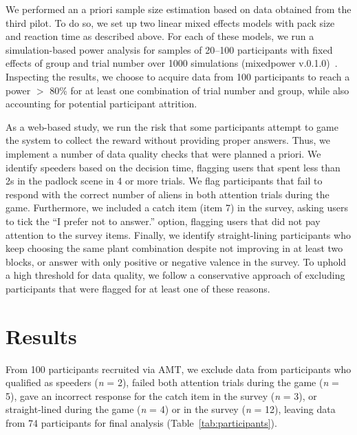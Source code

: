 We performed an a priori sample size estimation based on data obtained from the third pilot. 
To do so, we set up two linear mixed effects models with pack size and reaction time as described above. 
For each of these models, we run a simulation-based power analysis for samples of 20--100 participants with fixed effects of group and trial number over 1000 simulations (mixedpower v.0.1.0)~\citep{kumle_estimating_2021}. 
Inspecting the results, we choose to acquire data from 100 participants to reach a power $>$ 80\% for at least one combination of trial number and group, while also accounting for potential participant attrition.

As a web-based study, we run the risk that some participants attempt to game the system to collect the reward without providing proper answers. 
Thus, we implement a number of data quality checks that were planned a priori.
We identify speeders based on the decision time, flagging users that spent less than 2s in the padlock scene in 4 or more trials.
We flag participants that fail to respond with the correct number of aliens in both attention trials during the game.
Furthermore, we included a catch item (item 7) in the survey, asking users to tick the ``I prefer not to answer.'' option, flagging users that did not pay attention to the survey items.
Finally, we identify straight-lining participants who keep choosing the same plant combination despite not improving in at least two blocks, or answer with only positive or negative valence in the survey.
To uphold a high threshold for data quality, we follow a conservative approach of excluding participants that were flagged for at least one of these reasons.

\section{Results}\label{sec:results}

From 100 participants recruited via \gls{AMT}, we exclude data from participants who qualified as speeders (\textit{n} = 2), failed both attention trials during the game (\textit{n} = 5), gave an incorrect response for the catch item in the survey (\textit{n} = 3), or straight-lined during the game (\textit{n} = 4) or in the survey (\textit{n} = 12), leaving data from 74 participants for final analysis (Table~\ref{tab:participants}).

